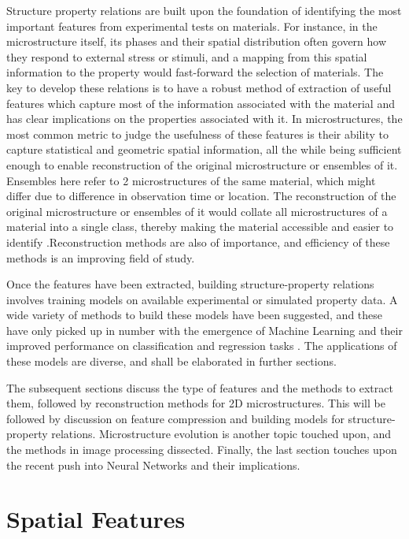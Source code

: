 \documentclass[12pt, a4paper]{report}
\begin{document}
Structure property relations are built upon the foundation of identifying the most important features from experimental tests on materials. For instance, in the microstructure itself, its phases and their spatial distribution often govern how they respond to external stress or stimuli, and a mapping from this spatial information to the property would fast-forward the selection of materials. The key to develop these relations is to have a robust method of extraction of useful features which capture most of the information associated with the material and has clear implications on the properties associated with it. In microstructures, the most common metric to judge the usefulness of these features is their ability to capture statistical and geometric spatial information, all the while being sufficient enough to enable reconstruction of the original microstructure or ensembles of it. Ensembles here refer to 2 microstructures of the same material, which might differ due to difference in observation time or location. The reconstruction of the original microstructure or ensembles of it would collate all microstructures of a material into a single class, thereby making the material accessible and easier to identify \cite{4fullwood2008microstructure}\cite{19kalidindi2016vision}.Reconstruction methods are also of importance, and efficiency of these methods is an improving field of study.

Once the features have been extracted, building structure-property relations involves training models on available experimental or simulated property data. A wide variety of methods to build these models have been suggested, and these have only picked up in number with the emergence of Machine Learning and their improved performance on classification and regression tasks \cite{18huang2020practicing}. The applications of these models are diverse, and shall be elaborated in further sections. 

The subsequent sections discuss the type of features and the methods to extract them, followed by reconstruction methods for 2D microstructures. This will be followed by discussion on feature compression and building models for structure-property relations. Microstructure evolution is another topic touched upon, and the methods in image processing dissected. Finally, the last section touches upon the recent push into Neural Networks and their implications.

\section{Spatial Features}
\end{document}
